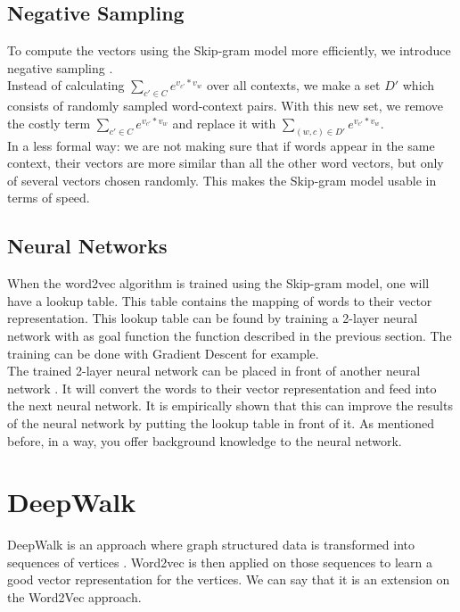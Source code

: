 \subsection{Negative Sampling}

To compute the vectors using the Skip-gram model more efficiently, we introduce negative sampling \cite{w2vExplained:article}. \\
Instead of calculating $\sum_{c' \in C}e^{v_{c'}*v_w}$ over all contexts, we make a set $D'$ which consists of randomly sampled word-context pairs. With this new set, we remove the costly term $\sum_{c' \in C}e^{v_{c'}*v_w}$ and replace it with $\sum_{(w,c) \in D'}e^{v_{c'}*v_w}$. \\

In a less formal way: we are not making sure that if words appear in the same context, their vectors are more similar than all the other word vectors, but only of several vectors chosen randomly. This makes the Skip-gram model usable in terms of speed.


\subsection{Neural Networks}

When the word2vec algorithm is trained using the Skip-gram model, one will have a lookup table. This table contains the mapping of words to their vector representation. This lookup table can be found by training a 2-layer neural network with as goal function the function described in the previous section. The training can be done with Gradient Descent for example. \\
The trained 2-layer neural network can be placed in front of another neural network \cite{w2vNN:online}. It will convert the words to their vector representation and feed into the next neural network. It is empirically shown that this can improve the results of the neural network by putting the lookup table in front of it. As mentioned before, in a way, you offer background knowledge to the neural network.

\section{DeepWalk}
\label{sec:deepwalk}

DeepWalk is an approach where graph structured data is transformed into sequences of vertices \cite{deepwalkMain:article}. Word2vec is then applied on those sequences to learn a good vector representation for the vertices. We can say that it is an extension on the Word2Vec approach. \\

